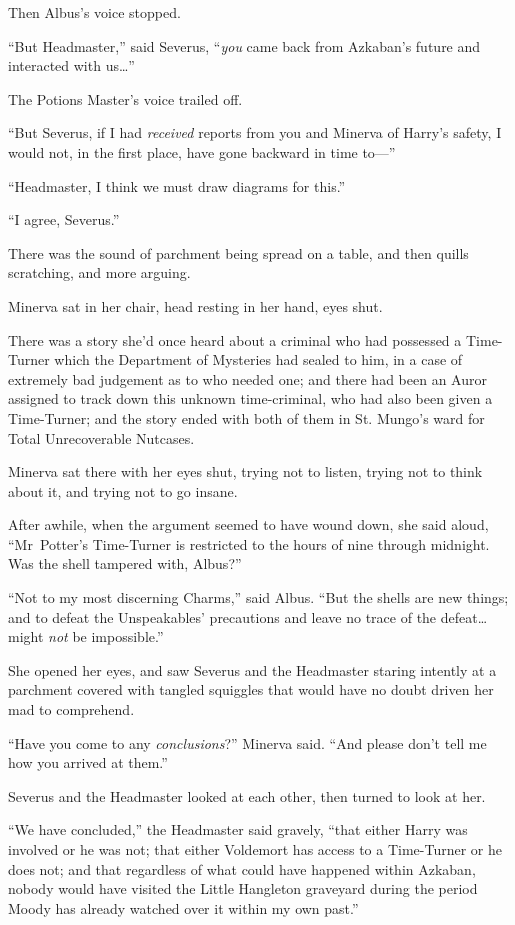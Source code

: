 Then Albus’s voice stopped.

“But Headmaster,” said Severus, “\emph{you} came back from Azkaban’s future and interacted with us…”

The Potions Master’s voice trailed off.

“But Severus, if I had \emph{received} reports from you and Minerva of Harry’s safety, I would not, in the first place, have gone backward in time to—”

“Headmaster, I think we must draw diagrams for this.”

“I agree, Severus.”

There was the sound of parchment being spread on a table, and then quills scratching, and more arguing.

Minerva sat in her chair, head resting in her hand, eyes shut.

There was a story she’d once heard about a criminal who had possessed a Time-Turner which the Department of Mysteries had sealed to him, in a case of extremely bad judgement as to who needed one; and there had been an Auror assigned to track down this unknown time-criminal, who had also been given a Time-Turner; and the story ended with both of them in St. Mungo’s ward for Total Unrecoverable Nutcases.

Minerva sat there with her eyes shut, trying not to listen, trying not to think about it, and trying not to go insane.

After awhile, when the argument seemed to have wound down, she said aloud,
“Mr~Potter’s Time-Turner is restricted to the hours of nine \pm through midnight. Was the shell tampered with, Albus?”

“Not to my most discerning Charms,” said Albus.
“But the shells are new things; and to defeat the Unspeakables’ precautions and leave no trace of the defeat…might \emph{not} be impossible.”

She opened her eyes, and saw Severus and the Headmaster staring intently at a parchment covered with tangled squiggles that would have no doubt driven her mad to comprehend.

“Have you come to any \emph{conclusions}?” Minerva said.
“And please don’t tell me how you arrived at them.”

Severus and the Headmaster looked at each other, then turned to look at her.

“We have concluded,” the Headmaster said gravely, “that either Harry was involved or he was not; that either Voldemort has access to a Time-Turner or he does not; and that regardless of what could have happened within Azkaban, nobody would have visited the Little Hangleton graveyard during the period Moody has already watched over it within my own past.”

